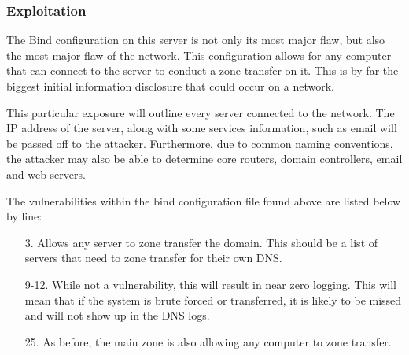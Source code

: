 			\subsubsection{Exploitation}
				The Bind configuration on this server is not only its most major flaw, but also the most major flaw of the network.
				This configuration allows for any computer that can connect to the server to conduct a zone transfer on it.
				This is by far the biggest initial information disclosure that could occur on a network.

				This particular exposure will outline every server connected to the network.
				The IP address of the server, along with some services information, such as email will be passed off to the attacker.
				Furthermore, due to common naming conventions, the attacker may also be able to determine core routers, domain controllers, email and web servers.

				The vulnerabilities within the bind configuration file found above are listed below by line:
				\begin{enumerate}
					\item[3.] Allows any server to zone transfer the domain.
						This should be a list of servers that need to zone transfer for their own DNS.
					\item[9-12.] While not a vulnerability, this will result in near zero logging.
						This will mean that if the system is brute forced or transferred,
						it is likely to be missed and will not show up in the DNS logs.
					\item[25.] As before, the main zone is also allowing any computer to zone transfer.
				\end{enumerate}

